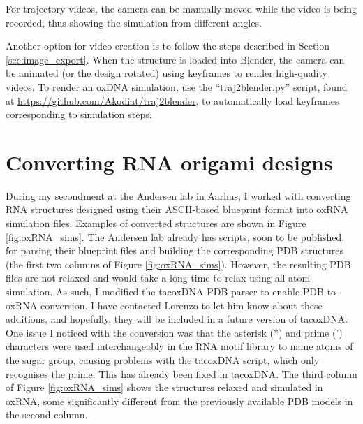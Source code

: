 For trajectory videos, the camera can be manually moved while the video is being recorded, thus showing the simulation from different angles.

Another option for video creation is to follow the steps described in Section \ref{sec:image_export}. When the structure is loaded into Blender, the camera can be animated (or the design rotated) using keyframes to render high-quality videos. To render an oxDNA simulation, use the ``traj2blender.py'' script, found at \url{https://github.com/Akodiat/traj2blender}, to automatically load keyframes corresponding to simulation steps.

\section{Converting RNA origami designs}
During my secondment at the Andersen lab in Aarhus, I worked with converting RNA structures designed using their ASCII-based blueprint format into oxRNA simulation files. Examples of converted structures are shown in Figure \ref{fig:oxRNA_sims}. The Andersen lab already has scripts, soon to be published, for parsing their blueprint files and building the corresponding PDB structures (the first two columns of Figure \ref{fig:oxRNA_sims}). However, the resulting PDB files are not relaxed and would take a long time to relax using all-atom simulation. As such, I modified the tacoxDNA \cite{suma2019tacoxdna} PDB parser to enable PDB-to-oxRNA conversion. I have contacted Lorenzo to let him know about these additions, and hopefully, they will be included in a future version of tacoxDNA. One issue I noticed with the conversion was that the asterisk (*) and prime (') characters were used interchangeably in the RNA motif library to name atoms of the sugar group, causing problems with the tacoxDNA script, which only recognises the prime. This has already been fixed in tacoxDNA. The third column of Figure \ref{fig:oxRNA_sims} shows the structures relaxed and simulated in oxRNA, some significantly different from the previously available PDB models in the second column.


